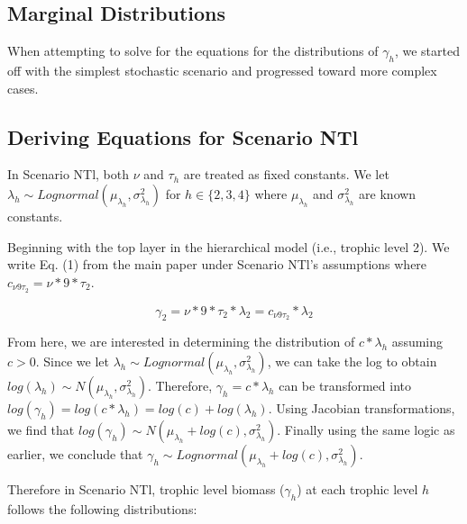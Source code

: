 \documentclass[oneside,12pt,final]{sty/ucthesis-CA2012}
\begin{document}
\begin{mainmatter}
\section{Marginal Distributions}
When attempting to solve for the equations for the distributions of $\gamma_h$, we started off with the simplest stochastic scenario and progressed toward more complex cases.  
 
\subsection{Deriving Equations for Scenario NTl}
In Scenario NTl, both $\nu$ and $\tau_h$ are treated as fixed constants. We let $\lambda_h \sim Lognormal(\mu_{\lambda_h}, \sigma^2_{\lambda_h} )$ for $h \in \{2, 3, 4\}$ where $\mu_{\lambda_h}$ and $\sigma^2_{\lambda_h}$ are known constants. 

\vspace{5mm}

Beginning with the top layer in the hierarchical model (i.e., trophic level 2). We write  Eq. (1) from the main paper under Scenario NTl's assumptions where $c_{\nu9\tau_2}=\nu*9*\tau_2$.

\begin{equation*}
\gamma_2 = \nu * 9 * \tau_2 *\lambda_2  = c_{\nu9\tau_2} *\lambda_2 
\end{equation*}

From here, we are interested in determining the distribution of $c*\lambda_h$ assuming $c>0$. Since we let $\lambda_h \sim Lognormal(\mu_{\lambda_h}, \sigma^2_{\lambda_h})$, we can take the log to obtain $log(\lambda_h) \sim N(\mu_{\lambda_h}, \sigma^2_{\lambda_h})$. Therefore, $\gamma_h = c*\lambda_h$ can be transformed into $log(\gamma_h) = log(c*\lambda_h) = log(c) + log(\lambda_h)$. Using Jacobian transformations, we find that $log(\gamma_h) \sim N(\mu_{\lambda_h} + log(c), \sigma^2_{\lambda_h})$. Finally using the same logic as earlier, we conclude that $\gamma_h \sim Lognormal(\mu_{\lambda_h} + log(c), \sigma^2_{\lambda_h})$.

\vspace{5mm}

Therefore in Scenario NTl, trophic level biomass ($\gamma_h$) at each trophic level $h$ follows the following distributions:


\end{mainmatter}
\end{document}
